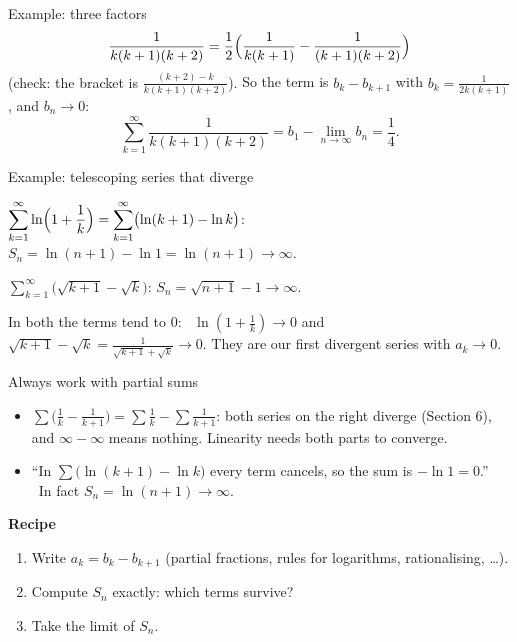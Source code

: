 \documentclass{wosm-slides}
\begin{document}
\begin{frame}{Example: three factors}
  \[ \frac{1}{k(k+1)(k+2)} = \frac12\Bigl(\frac{1}{k(k+1)} - \frac{1}{(k+1)(k+2)}\Bigr) \]
  {\small (check: the bracket is $\frac{(k+2) - k}{k(k+1)(k+2)}$).}
  \pause
  So the term is $b_k - b_{k+1}$ with $b_k = \frac{1}{2k(k+1)}$, and $b_n \to 0$:
  \[ \sum_{k=1}^\infty \frac{1}{k(k+1)(k+2)} = b_1 - \lim_{n\to\infty} b_n = \frac14 . \]
\end{frame}

\begin{frame}{Example: telescoping series that diverge}
  \begin{example}
    $\displaystyle\sum_{k=1}^\infty \ln\Bigl(1 + \frac1k\Bigr)
      = \sum_{k=1}^\infty \bigl(\ln(k+1) - \ln k\bigr)$:
    \quad $S_n = \ln(n+1) - \ln 1 = \ln(n+1) \to \infty$.
  \end{example}
  \pause
  \begin{example}
    $\displaystyle\sum_{k=1}^\infty \bigl(\sqrt{k+1} - \sqrt{k}\bigr)$:
    \quad $S_n = \sqrt{n+1} - 1 \to \infty$.
  \end{example}
  \pause
  In both the terms tend to $0$: \ $\ln(1 + \frac1k) \to 0$ and
  $\sqrt{k+1} - \sqrt{k} = \frac{1}{\sqrt{k+1} + \sqrt{k}} \to 0$.
  They are our first divergent series with $a_k \to 0$.
\end{frame}

\begin{frame}{Always work with partial sums}
  \begin{warning}
    \begin{itemize}
      \item $\sum \bigl(\frac1k - \frac1{k+1}\bigr) = \sum \frac1k - \sum \frac1{k+1}$:
        both series on the right diverge (Section 6), and $\infty - \infty$ means nothing.
        Linearity needs both parts to converge.
      \item ``In $\sum \bigl(\ln(k+1) - \ln k\bigr)$ every term cancels, so the sum is
        $-\ln 1 = 0$.'' \ In fact $S_n = \ln(n+1) \to \infty$.
    \end{itemize}
  \end{warning}
  \pause
  \textbf{Recipe}
  \begin{enumerate}
    \item Write $a_k = b_k - b_{k+1}$ (partial fractions, rules for logarithms,
      rationalising, \dots).
    \item Compute $S_n$ exactly: which terms survive?
    \item Take the limit of $S_n$.
  \end{enumerate}
\end{frame}
\end{document}
